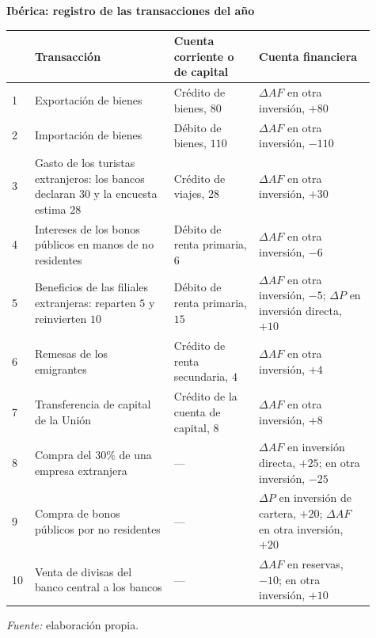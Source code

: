 \documentclass[10pt,a4paper]{article}
\begin{document}
\begin{center}\begin{minipage}{\linewidth}\centering
{\small\textbf{Ibérica: registro de las transacciones del año}}\par\vspace{0.3em}
\footnotesize
\begin{tabular}{p{0.03\linewidth}p{0.36\linewidth}p{0.22\linewidth}p{0.30\linewidth}}
\hline
 & Transacción & Cuenta corriente o de capital & Cuenta financiera\\
\hline
1 & Exportación de bienes & Crédito de bienes, $80$ & $\Delta AF$ en otra inversión, $+80$\\
2 & Importación de bienes & Débito de bienes, $110$ & $\Delta AF$ en otra inversión, $-110$\\
3 & Gasto de los turistas extranjeros: los bancos declaran $30$ y la encuesta estima $28$ & Crédito de viajes, $28$ & $\Delta AF$ en otra inversión, $+30$\\
4 & Intereses de los bonos públicos en manos de no residentes & Débito de renta primaria, $6$ & $\Delta AF$ en otra inversión, $-6$\\
5 & Beneficios de las filiales extranjeras: reparten $5$ y reinvierten $10$ & Débito de renta primaria, $15$ & $\Delta AF$ en otra inversión, $-5$; $\Delta P$ en inversión directa, $+10$\\
6 & Remesas de los emigrantes & Crédito de renta secundaria, $4$ & $\Delta AF$ en otra inversión, $+4$\\
7 & Transferencia de capital de la Unión & Crédito de la cuenta de capital, $8$ & $\Delta AF$ en otra inversión, $+8$\\
8 & Compra del $30\%$ de una empresa extranjera & --- & $\Delta AF$ en inversión directa, $+25$; en otra inversión, $-25$\\
9 & Compra de bonos públicos por no residentes & --- & $\Delta P$ en inversión de cartera, $+20$; $\Delta AF$ en otra inversión, $+20$\\
10 & Venta de divisas del banco central a los bancos & --- & $\Delta AF$ en reservas, $-10$; en otra inversión, $+10$\\
\hline
\end{tabular}\par\vspace{0.3em}
{\small\textit{Fuente: }elaboración propia.}
\end{minipage}\end{center}
\end{document}
